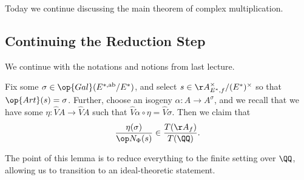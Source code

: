 \documentclass[../notes.tex]{subfiles}
\begin{document}
Today we continue discussing the main theorem of complex multiplication.

\subsection{Continuing the Reduction Step}
We continue with the notations and notions from last lecture.
\begin{lemma}
	Fix some $\sigma\in\op{Gal}(E^{*,\mathrm{ab}}/E^*)$, and select $s\in\AA_{E^*,f}^\times/(E^*)^\times$ so that $\op{Art}(s)=\sigma$. Further, choose an isogeny $\alpha\colon A\to A^\sigma$, and we recall that we have some $\eta\colon\widehat V A\to\widehat V A$ such that $\widehat V\alpha\circ\eta=\widehat V\sigma$. Then we claim that
	\[\frac{\eta(\sigma)}{\op N_\Phi(s)}\in\frac{T(\AA_f)}{T(\QQ)}.\]
\end{lemma}
The point of this lemma is to reduce everything to the finite setting over $\QQ$, allowing us to transition to an ideal-theoretic statement.
\end{document}
